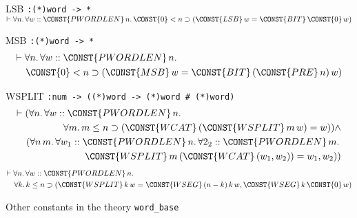 \begin{table}
\begin{center}
\begin{constants}
\item[LSB] \verb":(*)word -> *" \newline
        $\THM \FORALL n\DOT
        \FORALL w::\CONST{PWORDLEN} \,n\DOT
                 \CONST{0} \LES  n \IMP 
                    (\CONST{LSB} \,w = \CONST{BIT} \,\CONST{0} \,w)$
\item[MSB] \verb":(*)word -> *" 
\begin{eqnarray*}
\lefteqn{\THM \FORALL n\DOT
        \FORALL w::\CONST{PWORDLEN} \,n\DOT}\\
 & &             \CONST{0} \LES  n \IMP 
                    (\CONST{MSB} \,w =
                        \CONST{BIT} \,(\CONST{PRE} \,n) \,w)
\end{eqnarray*}
\item[WSPLIT] \verb":num -> ((*)word -> (*)word # (*)word)" 
\begin{eqnarray*}
\lefteqn{\THM (\FORALL n\DOT
         \FORALL w::\CONST{PWORDLEN} \,n.}\\
 & & {}\FORALL m\DOT m \LEE  n \IMP 
       (\CONST{WCAT} \,(\CONST{WSPLIT} \,m \,w) = w)) \AND \\
 & &     (\FORALL n \,m\DOT
         \FORALL w_1 :: \CONST{PWORDLEN} \,n\DOT
         \FORALL 2_2 :: \CONST{PWORDLEN} \,m\DOT \\
 & & \quad \CONST{WSPLIT} \,m \,(\CONST{WCAT} \,(w_{1},w_{2})) = w_{1},w_{2}))
\end{eqnarray*}
\begin{eqnarray*}
\lefteqn{\THM \FORALL n\DOT
        \FORALL w ::\CONST{PWORDLEN} \,n\DOT}\\
 & & {}\FORALL k\DOT k \LEE  n \IMP 
                        (\CONST{WSPLIT} \,k \,w =
                            \CONST{WSEG} \,(n - k) \,k \,w,
                            \CONST{WSEG} \,k \,\CONST{0} \,w)
\end{eqnarray*}
\end{constants}
\end{center}
\caption{Other constants in the theory {\tt word\_base}\label{tab-other-const}}
\end{table}

